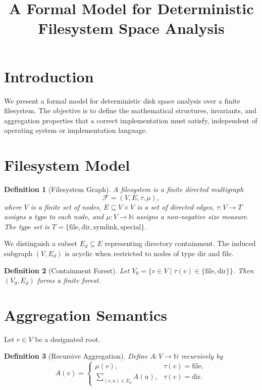 \documentclass[11pt]{article}
\title{A Formal Model for Deterministic Filesystem Space Analysis}
\author{}
\date{}
\newtheorem{definition}{Definition}
\begin{document}
\maketitle

\section{Introduction}

We present a formal model for deterministic disk space analysis over a finite filesystem.
The objective is to define the mathematical structures, invariants, and aggregation
properties that a correct implementation must satisfy, independent of operating system or implementation language.

\section{Filesystem Model}

\begin{definition}[Filesystem Graph]
A filesystem is a finite directed multigraph
\[
\mathcal{F} = (V, E, \tau, \mu),
\]
where $V$ is a finite set of nodes, $E \subseteq V \times V$ is a set of directed edges,
$\tau : V \to T$ assigns a type to each node, and
$\mu : V \to \mathbb{N}$ assigns a non-negative size measure.
The type set is $T = \{\mathrm{file}, \mathrm{dir}, \mathrm{symlink}, \mathrm{special}\}$.
\end{definition}

We distinguish a subset $E_d \subseteq E$ representing directory containment.
The induced subgraph $(V, E_d)$ is acyclic when restricted to nodes of type $\mathrm{dir}$ and $\mathrm{file}$.

\begin{definition}[Containment Forest]
Let $V_0 = \{ v \in V \mid \tau(v) \in \{\mathrm{file}, \mathrm{dir}\} \}$.
Then $(V_0, E_d)$ forms a finite forest.
\end{definition}

\section{Aggregation Semantics}

Let $r \in V$ be a designated root.

\begin{definition}[Recursive Aggregation]
Define $A : V \to \mathbb{N}$ recursively by
\[
A(v) =
\begin{cases}
\mu(v), & \tau(v) = \mathrm{file}, \\
\sum_{(v,u) \in E_d} A(u), & \tau(v) = \mathrm{dir}.
\end{cases}
\]
\end{definition}
\end{document}
